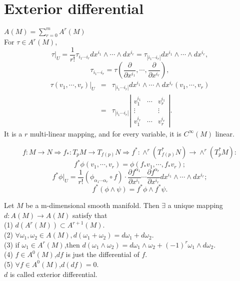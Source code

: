 \section{Exterior differential}
\begin{newdef}
$A(M) = \sum_{r=0}^{m} A^{r}(M)$\\
For $\tau \in A^r(M)$,
\[\tau|_{U} = \frac{1}{r!} \tau_{i_1\cdots i_r} dx^{i_1} \wedge \cdots \wedge dx^{i_r} = \tau_{|i_1\cdots i_r|} dx^{i_1} \wedge \cdots \wedge dx^{i_r},\] 
\[ \tau_{i_1\cdots i_r} = \tau(\frac{\partial}{\partial x^{i_1}},\cdots,\frac{\partial}{\partial x^{i_r}}),\]
\begin{eqnarray}
\tau(v_1,\cdots,v_r)|_{U} &=& \tau_{|i_1\cdots i_r|}dx^{i_1} \wedge \cdots \wedge dx^{i_r} (v_1,\cdots,v_r) \nonumber \\
&=& \tau_{|i_1\cdots i_r|} \left| \begin{matrix} v_1^{i_1}& \cdots & v_r^{i_1}\\ \vdots & & \vdots \\ v_1^{i_r} & \cdots & v_r^{i_r} \end{matrix} \right| . \nonumber
\end{eqnarray}
It is a $r$ multi-linear mapping, and for every variable, it is $C^{\infty}(M)$ linear.
\end{newdef}

\begin{newprop}
\[f:M \to N \Rightarrow f_{*}:T_{p}M \to T_{f(p)}N \Rightarrow f^{*}:\wedge^{r}(T_{f(p)}^{*}N) \to \wedge^{r}(T_p^*M):\]
\[f^* \phi(v_1,\cdots,v_r) = \phi(f_*v_1,\cdots,f_*v_r);\]
\[f^*\phi|_U = \frac{1}{r!}(\phi_{\alpha_1\cdots\alpha_r} \circ f) \cdot \frac{\partial f^{\alpha_1}}{\partial x^{i_1}} \cdots \frac{\partial f^{\alpha_r}}{\partial x^{i_r}} dx^{i_1} \wedge \cdots \wedge dx^{i_r};\]
\[f^*(\phi \wedge \psi) = f^*\phi \wedge f^* \psi.\]
\end{newprop}

\begin{newdef}
Let $M$ be a m-dimensional smooth manifold. Then $\exists$ a unique mapping $d:A(M) \to A(M)$ satisfy that\\
(1) $d(A^r(M)) \subset A^{r+1}(M)$.\\
(2) $\forall \omega_1,\omega_2 \in A(M),d(\omega_1+\omega_2) = d\omega_1 +d\omega_2$.\\
(3) if $\omega_1 \in A^r(M)$,then $d(\omega_1 \wedge \omega_2)=d\omega_1 \wedge \omega_2 +(-1)^r \omega_1 \wedge d\omega_2$.\\
(4) $f \in A^0(M)$,$df$ is just the differential of $f$.\\
(5) $\forall f \in A^0(M)$,$d(df)=0$.\\
$d$ is called exterior differential.
\end{newdef}

